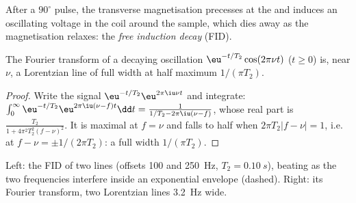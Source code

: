 \begin{definition}\label{def:b3:advanced-nmr:fid}
After a $90^\circ$ pulse, the transverse magnetisation precesses at the  and induces an oscillating voltage in the coil around the sample,
which dies away as the magnetisation relaxes: the \emph{free induction
decay} (FID).
\end{definition}

\begin{theorem}\label{thm:b3:advanced-nmr:lorentzian}
The Fourier transform of a decaying oscillation $\eu^{-t/T_2}\cos(2\pi\nu t)$ ($t \ge 0$) is,
near $\nu$, a Lorentzian line of full width at half maximum $1/(\pi T_2)$.
\end{theorem}

\begin{proof}
Write the signal $\eu^{-t/T_2}\eu^{2\pi\iu\nu t}$ and integrate:
$\int_0^\infty\eu^{-t/T_2}\eu^{2\pi\iu(\nu - f)t}\dd t = \frac{1}{1/T_2 - 2\pi\iu(\nu - f)}$, whose real
part is $\frac{T_2}{1 + 4\pi^2T_2^2(f - \nu)^2}$. It is maximal at $f = \nu$ and falls to
half when $2\pi T_2|f - \nu| = 1$, i.e. at $f - \nu = \pm1/(2\pi T_2)$: a full width
$1/(\pi T_2)$.
\end{proof}

\begin{omfigure}

{\small Left: the FID of two lines (offsets 100 and \qty{250}{Hz}, $T_2 = \qty{0.10}{s}$),
beating as the two frequencies interfere inside an exponential envelope
(dashed). Right: its Fourier transform, two Lorentzian lines \qty{3.2}{Hz} wide.}
\end{omfigure}

